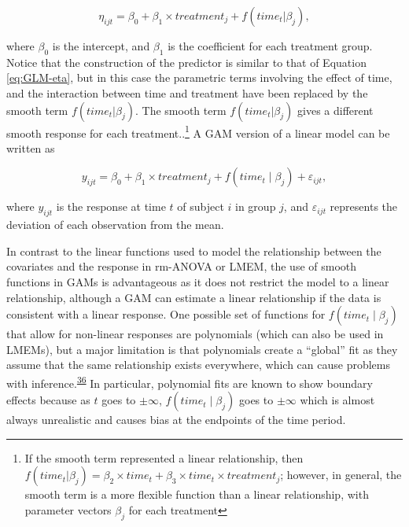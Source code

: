 \documentclass[
]{article}
\begin{document}
\begin{equation}
\eta_{ijt}=\beta_{0}+ \beta_{1} \times treatment_{j} +f(time_{t}|\beta_{j}),
\label{eq:GAM-eta}
\end{equation}

where \(\beta_{0}\) is the intercept, and \(\beta_{1}\) is the coefficient for each treatment group. Notice that the construction of the predictor is similar to that of Equation \eqref{eq:GLM-eta}, but in this case the parametric terms involving the effect of time, and the interaction between time and treatment have been replaced by the smooth term \(f(time_{t}|\beta_{j})\). The smooth term \(f(time_{t}|\beta_{j})\) gives a different smooth response for each treatment..\footnote{If the smooth term represented a linear relationship, then \(f(time_{t}|\beta_{j})= \beta_2 \times time_t+\beta_3 \times time_t \times treatment_j\); however, in general, the smooth term is a more flexible function than a linear relationship, with parameter vectors \(\beta_{j}\) for each treatment} A GAM version of a linear model can be written as

\begin{equation}
  y_{ijt}=\beta_0+ \beta_1 \times treatment_j + f(time_t\mid \beta_j)+\varepsilon_{ijt},
  \label{eq:GAM}
\end{equation}

where \(y_{ijt}\) is the response at time \(t\) of subject \(i\) in group \(j\), and \(\varepsilon_{ijt}\) represents the deviation of each observation from the mean.

In contrast to the linear functions used to model the relationship between the covariates and the response in rm-ANOVA or LMEM, the use of smooth functions in GAMs is advantageous as it does not restrict the model to a linear relationship, although a GAM can estimate a linear relationship if the data is consistent with a linear response. One possible set of functions for \(f(time_t\mid \beta_j)\) that allow for non-linear responses are polynomials (which can also be used in LMEMs), but a major limitation is that polynomials create a ``global'' fit as they assume that the same relationship exists everywhere, which can cause problems with inference.\textsuperscript{\protect\hyperlink{ref-beck1998}{36}} In particular, polynomial fits are known to show boundary effects because as \(t\) goes to \(\pm \infty\), \(f(time_t \mid \beta_j)\) goes to \(\pm \infty\) which is almost always unrealistic and causes bias at the endpoints of the time period.
\end{document}
